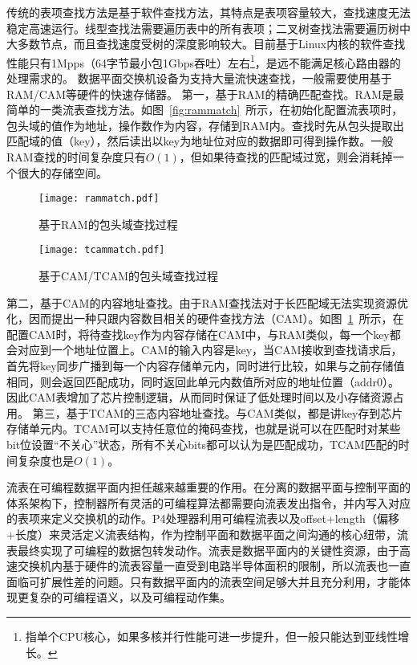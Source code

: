 传统的表项查找方法是基于软件查找方法，其特点是表项容量较大，查找速度无法稳定高速运行。线型查找法需要遍历表中的所有表项；二叉树查找法需要遍历树中大多数节点，而且查找速度受树的深度影响较大。目前基于Linux内核的软件查找性能只有1Mpps（64字节最小包1Gbps吞吐）左右\footnote{指单个CPU核心，如果多核并行性能可进一步提升，但一般只能达到亚线性增长。}，是远不能满足核心路由器的处理需求的。
数据平面交换机设备为支持大量流快速查找，一般需要使用基于RAM/CAM等硬件的快速存储器。
第一，基于RAM的精确匹配查找。RAM是最简单的一类流表查找方法。如图~\ref{fig:rammatch}~所示，在初始化配置流表项时，包头域的值作为地址，操作数作为内容，存储到RAM内。查找时先从包头提取出匹配域的值（key），然后读出以key为地址位对应的数据即可得到操作数。一般RAM查找的时间复杂度只有$O(1)$，但如果待查找的匹配域过宽，则会消耗掉一个很大的存储空间。
\begin{figure}[htbp]
	\centering 
	\vspace{-1.5mm}
	\begin{minipage}[t]{0.39\textwidth}
		\centering
		\texttt{[image: rammatch.pdf]}
		\caption{基于RAM的包头域查找过程} \label{fig:rammatch}
	\end{minipage}
	\begin{minipage}[t]{0.6\textwidth}
		\centering
		\texttt{[image: tcammatch.pdf]}%
		\caption{基于CAM/TCAM的包头域查找过程} \label{fig:tcammatch}
	\end{minipage}
\end{figure}
第二，基于CAM的内容地址查找。由于RAM查找法对于长匹配域无法实现资源优化，因而提出一种只跟内容数目相关的硬件查找方法（CAM）。如图~\ref{fig:tcammatch}~所示，在配置CAM时，将待查找key作为内容存储在CAM中，与RAM类似，每一个key都会对应到一个地址位置上。CAM的输入内容是key，当CAM接收到查找请求后，首先将key同步广播到每一个内容存储单元内，同时进行比较，如果与之前存储值相同，则会返回匹配成功，同时返回此单元内数值所对应的地址位置（addr0）。因此CAM表增加了芯片控制逻辑，从而同时保证了低处理时间以及小存储资源占用。
第三，基于TCAM的三态内容地址查找。与CAM类似，都是讲key存到芯片存储单元内。TCAM可以支持任意位的掩码查找，也就是说可以在匹配时对某些bit位设置“不关心”状态，所有不关心bits都可以认为是匹配成功，TCAM匹配的时间复杂度也是$O(1)$。



流表在可编程数据平面内担任越来越重要的作用。在分离的数据平面与控制平面的体系架构下，控制器所有灵活的可编程算法都需要向流表发出指令，并内写入对应的表项来定义交换机的动作。P4处理器利用可编程流表以及offset+length（偏移+长度）来灵活定义流表结构，作为控制平面和数据平面之间沟通的核心纽带，流表最终实现了可编程的数据包转发动作。流表是数据平面内的关键性资源，由于高速交换机内基于硬件的流表容量一直受到电路半导体面积的限制，所以流表也一直面临可扩展性差的问题。只有数据平面内的流表空间足够大并且充分利用，才能体现更复杂的可编程语义，以及可编程动作集。

